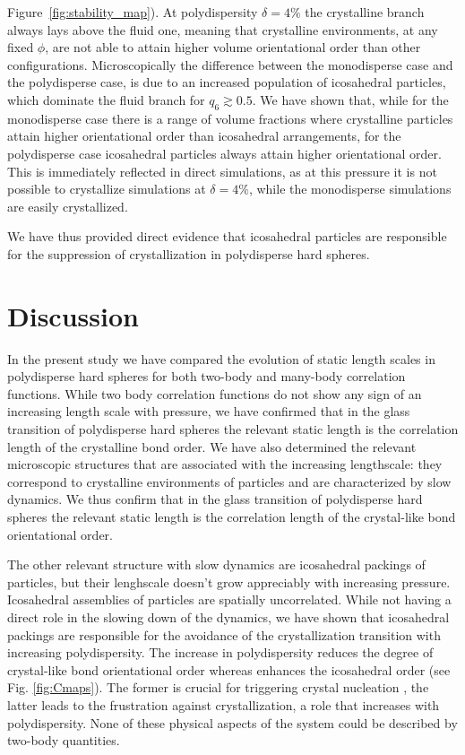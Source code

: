 \documentclass[twocolumn,superscriptaddress]{revtex4-1}
\begin{document}
Figure~\ref{fig:stability_map}).
At polydispersity $\delta=4\%$ the crystalline branch always lays above the fluid one, meaning that
crystalline environments, at any fixed $\phi$, are not able to attain higher volume orientational order than other configurations.
Microscopically the difference between the monodisperse case and the polydisperse case, is due to an increased population of icosahedral particles, which dominate the fluid branch for $q_6\gtrsim 0.5$.
We have shown that, while for the monodisperse case there is a range of volume fractions where crystalline particles
attain higher orientational order than icosahedral arrangements, for the polydisperse case icosahedral
particles always attain higher orientational order.
This is immediately reflected in direct simulations,
as at this pressure it is not possible to crystallize simulations at $\delta=4\%$, while the
monodisperse simulations are easily crystallized.

We have thus provided direct evidence that icosahedral particles are responsible for the suppression
of crystallization in polydisperse hard spheres.

\section{Discussion}\label{sec:discussion}

In the present study we have compared the evolution of static length scales in polydisperse hard spheres
for both two-body and many-body correlation functions. While two body correlation functions do not
show any sign of an increasing length scale with pressure, we have confirmed that in the glass transition of polydisperse hard spheres the relevant static length is the correlation length of the crystalline bond order.
We have also determined the relevant microscopic structures that are associated with the increasing
lengthscale: they correspond to crystalline environments of particles and are characterized by slow
dynamics.
We thus confirm that in the glass transition of polydisperse hard spheres the relevant static length is the correlation length of the crystal-like bond orientational order.

The other relevant structure with slow dynamics are icosahedral packings of particles, but
their lenghscale doesn't grow appreciably with increasing pressure. Icosahedral assemblies of particles
are spatially uncorrelated. While not having a direct role in the slowing down of the dynamics, we
have shown that icosahedral packings are responsible for the avoidance of the crystallization transition
with increasing polydispersity.
The increase in polydispersity reduces the degree of crystal-like bond orientational order whereas enhances the icosahedral order (see Fig. \ref{fig:Cmaps}). 
The former is crucial for triggering 
crystal nucleation \cite{russo_hs}, the latter leads to the frustration against crystallization, a role that increases with polydispersity. None of these physical aspects of the system could be described by two-body quantities. 
\end{document}
